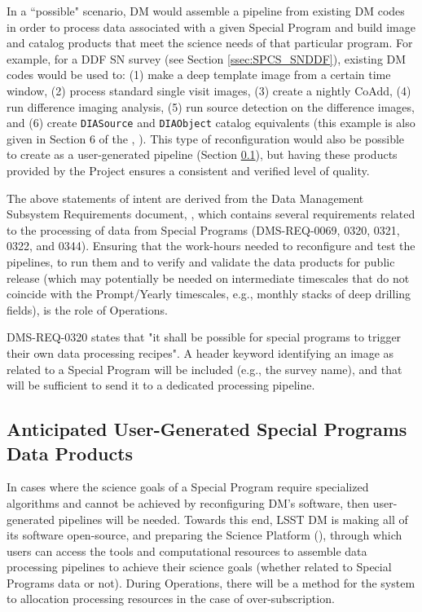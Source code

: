 \documentclass[DM,lsstdoc,toc]{lsstdoc}
\begin{document}
In a ``possible" scenario, DM would assemble a pipeline from existing DM codes in order to process data associated with a given Special Program and build image and catalog products that meet the science needs of that particular program. For example, for a DDF SN survey (see Section \ref{ssec:SPCS_SNDDF}), existing DM codes would be used to: (1) make a deep template image from a certain time window, (2) process standard single visit images, (3) create a nightly CoAdd, (4) run difference imaging analysis, (5) run source detection on the difference images, and (6) create \texttt{DIASource} and \texttt{DIAObject} catalog equivalents (this example is also given in Section 6 of the \DPDD, ). This type of reconfiguration would also be possible to create as a user-generated pipeline (Section \ref{ssec:dmplans_user}), but having these products provided by the Project ensures a consistent and verified level of quality. %

The above statements of intent are derived from the Data Management Subsystem Requirements document, , which contains several requirements related to the processing of data from Special Programs (DMS-REQ-0069, 0320, 0321, 0322, and 0344). 
Ensuring that the work-hours needed to reconfigure and test the pipelines, to run them and to verify and validate the data products for public release (which may potentially be needed on intermediate timescales that do not coincide with the Prompt/Yearly timescales, e.g., monthly stacks of deep drilling fields), is the role of Operations.

DMS-REQ-0320 states that "it shall be possible for special programs to trigger their own data processing recipes".
A header keyword identifying an image as related to a Special Program will be included (e.g., the survey name), and that will be sufficient to send it to a dedicated processing pipeline. 


\subsection{Anticipated User-Generated Special Programs Data Products}\label{ssec:dmplans_user}

In cases where the science goals of a Special Program require specialized algorithms and cannot be achieved by reconfiguring DM's software, then user-generated pipelines will be needed.
Towards this end, LSST DM is making all of its software open-source, and preparing the Science Platform (), through which users can access the tools and computational resources to assemble data processing pipelines to achieve their science goals (whether related to Special Programs data or not).
During Operations, there will be a method for the system to allocation processing resources in the case of over-subscription.
\end{document}

